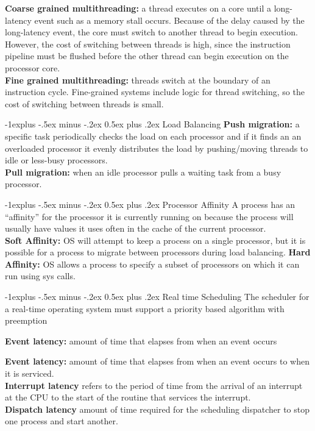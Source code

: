 \documentclass[letterpaper, 8pt]{extarticle}
\makeatletter
\renewcommand{\subsection}{\@startsection{subsection}{2}{0mm}%
                                {-1explus -.5ex minus -.2ex}%
                                {0.5ex plus .2ex}%
                                {\normalfont\small\bfseries}}
\makeatother
\begin{document}
\begin{multicols*}{6}
    \textbf{Coarse grained multithreading:} a thread executes on a core until a
    long-latency event such as a memory stall occurs. Because of the delay
    caused by the long-latency event, the core must switch to another thread to
    begin execution. However, the cost of switching between threads is high,
    since the instruction pipeline must be flushed before the other thread can
    begin execution on the processor core. \\
    \textbf{Fine grained multithreading:} threads switch at the boundary of
    an instruction cycle. Fine-grained systems include logic
    for thread switching, so the cost of switching between threads is small.

    \subsection{Load Balancing}
    \textbf{Push migration:} a specific task periodically checks the
    load on each processor and if it finds an an overloaded processor it
    evenly distributes the load by pushing/moving threads to idle or less-busy
    processors.\\
    \textbf{Pull migration:} when an idle processor pulls a waiting task
    from a busy processor.

    \subsection{Processor Affinity}
    A process has an ``affinity'' for the processor it is currently
    running on because the process will usually have values it uses often
    in the cache of the current processor.\\
    \textbf{Soft Affinity:} OS will attempt to keep a process on a single
    processor, but it is possible for a process to migrate
    between processors during load balancing.
    \textbf{Hard Affinity:} OS allows a process to specify a subset of
    processors on which it can run using sys calls.

    \subsection{Real time Scheduling}
    The scheduler for a real-time operating system must support a priority based
    algorithm with preemption

    \textbf{Event latency:} amount of time that elapses from when an event occurs

    \textbf{Event latency:} amount of time that elapses from when an event occurs 
    to when it is serviced.\\
    \textbf{Interrupt latency} refers to the period of time from the arrival of
    an interrupt at the CPU to the start of the routine that services the
    interrupt.\\
    \textbf{Dispatch latency} amount of time required for the scheduling
    dispatcher to stop one process and start another.


\end{multicols*}
\end{document}
